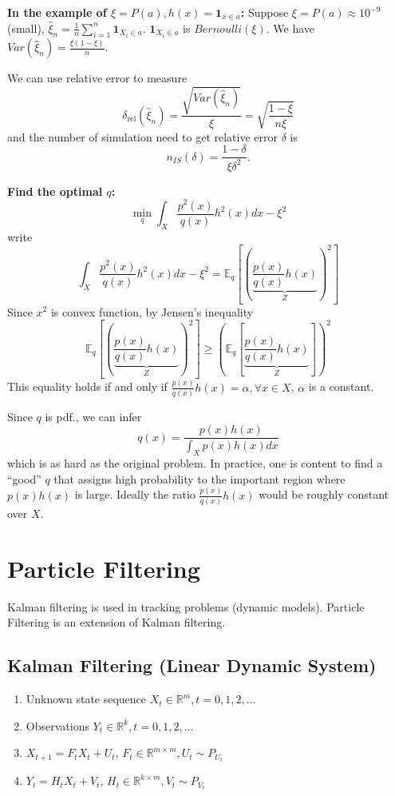 \documentclass[11pt]{elegantbook}
\begin{document}
\textbf{In the example of $\xi=P(a), h(x)=\mathbf{1}_{x\in a}$:} Suppose $\xi=P(a)\approx 10^{-9}$ (small), $\hat{\xi}_n=\frac{1}{n}\sum_{i=1}^n\mathbf{1}_{X_i\in a}$. $\mathbf{1}_{X_i\in a}$ is $Bernoulli(\xi)$. We have $Var(\hat{\xi}_n)=\frac{\xi(1-\xi)}{n}$.

We can use relative error to measure $$\delta_{\mathrm{rel}}\left(\hat{\xi}_n\right)=\frac{\sqrt{Var(\hat{\xi}_n)}}{\xi}=\sqrt{\frac{1-\xi}{n\xi}}$$
and the number of simulation need to get relative error $\delta$ is $$
n_{I S}(\delta)=\frac{1-\delta} {\xi \delta^2} .
$$

\textbf{Find the optimal $q$:}
$$\min_q\int_X\frac{p^2(x)}{q(x)}h^2(x)dx-\xi^2$$
write $$\int_X\frac{p^2(x)}{q(x)}h^2(x)dx-\xi^2=\mathbb{E}_q\left[\left(\underbrace{\frac{p(x)}{q(x)}h(x)}_{Z}\right)^2\right]$$
Since $x^2$ is convex function, by Jensen's inequality
$$\mathbb{E}_q\left[\left(\underbrace{\frac{p(x)}{q(x)}h(x)}_{Z}\right)^2\right]\geq \left(\mathbb{E}_q\left[\underbrace{\frac{p(x)}{q(x)}h(x)}_{Z}\right]\right)^2$$
This equality holds if and only if $\frac{p(x)}{q(x)}h(x)=\alpha,\forall x\in X$, $\alpha$ is a constant.

Since $q$ is pdf., we can infer $$q(x)=\frac{p(x)h(x)}{\int_Xp(x)h(x)dx}$$
which is as hard as the original problem. In practice, one is content to find a “good” $q$ that assigns high probability to the important region where $p(x)h(x)$ is large. Ideally the ratio $\frac{p(x)}{q(x)}h(x)$ would be roughly constant over $X$.


\chapter{Particle Filtering}
Kalman filtering is used in tracking problems (dynamic models). Particle Filtering is an extension of Kalman filtering.
\section{Kalman Filtering (Linear Dynamic System)}
\begin{enumerate}
    \item Unknown state sequence $X_t\in \mathbb{R}^m,t=0,1,2,...$
    \item Observations $Y_t\in \mathbb{R}^k,t=0,1,2,...$
    \item $X_{t+1}=F_tX_t+U_t$, $F_t\in \mathbb{R}^{m\times m}, U_t\sim P_{U_t}$
    \item $Y_t=H_tX_t+V_t$, $H_t\in \mathbb{R}^{k\times m}, V_t\sim P_{V_t}$
\end{enumerate}
\end{document}
